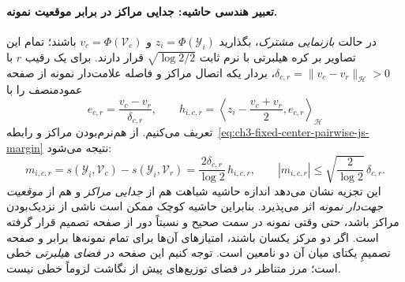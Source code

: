 \paragraph{تعبیر هندسی حاشیه: جدایی مراکز در برابر موقعیت نمونه.}
در حالت \emph{بازنمایی مشترک}،
بگذارید $z_i=\Phi(\mathscr Y_i)$ و
$v_c=\Phi(\mathcal V_c)$ باشند؛
تمام این تصاویر بر کره هیلبرتی
با نرم ثابت $\sqrt{\log2/2}$ قرار دارند.
برای یک رقیب $r$ با
$\delta_{c,r}=\|v_c-v_r\|_{\mathcal H}>0$،
بردار یکه اتصال مراکز و فاصله علامت‌دار
نمونه از صفحه عمودمنصف را با
\[
e_{c,r}=\frac{v_c-v_r}{\delta_{c,r}},
\qquad
h_{i,c,r}
=\left\langle
z_i-\frac{v_c+v_r}{2},e_{c,r}
\right\rangle_{\mathcal H}
\]
تعریف می‌کنیم. از هم‌نرم‌بودن مراکز
و رابطه~\eqref{eq:ch3-fixed-center-pairwise-js-margin}
نتیجه می‌شود:
\begin{equation}\label{eq:ch3-js-margin-separation-factorization}
\boxed{
m_{i,c,r}
=s(\mathscr Y_i,\mathcal V_c)
-s(\mathscr Y_i,\mathcal V_r)
=\frac{2\delta_{c,r}}{\log2}\,h_{i,c,r},
\qquad
|m_{i,c,r}|
\le\sqrt{\frac{2}{\log2}}\,\delta_{c,r}.
}
\end{equation}
این تجزیه نشان می‌دهد اندازه حاشیه شباهت
هم از \emph{جدایی مراکز}
و هم از \emph{موقعیت جهت‌دار نمونه}
اثر می‌پذیرد. بنابراین حاشیه کوچک
ممکن است ناشی از نزدیک‌بودن مراکز باشد،
حتی وقتی نمونه در سمت صحیح و نسبتاً دور
از صفحه تصمیم قرار گرفته است.
اگر دو مرکز یکسان باشند،
امتیازهای آن‌ها برای تمام نمونه‌ها برابر
و صفحه تصمیمِ یکتای میان آن دو نامعین است.
توجه کنیم این صفحه در \emph{فضای هیلبرتی}
خطی است؛ مرز متناظر در فضای توزیع‌های
پیش از نگاشت لزوماً خطی نیست.

